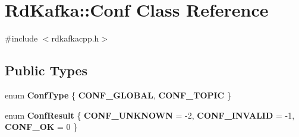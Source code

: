 \hypertarget{classRdKafka_1_1Conf}{\section{Rd\-Kafka\-:\-:Conf Class Reference}
\label{classRdKafka_1_1Conf}
}


{\ttfamily \#include $<$rdkafkacpp.\-h$>$}

\subsection*{Public Types}
\begin{DoxyCompactItemize}
\item 
enum {\bfseries Conf\-Type} \{ {\bfseries C\-O\-N\-F\-\_\-\-G\-L\-O\-B\-A\-L}, 
{\bfseries C\-O\-N\-F\-\_\-\-T\-O\-P\-I\-C}
 \}
\item 
enum {\bfseries Conf\-Result} \{ {\bfseries C\-O\-N\-F\-\_\-\-U\-N\-K\-N\-O\-W\-N} = -\/2, 
{\bfseries C\-O\-N\-F\-\_\-\-I\-N\-V\-A\-L\-I\-D} = -\/1, 
{\bfseries C\-O\-N\-F\-\_\-\-O\-K} = 0
 \}
\end{DoxyCompactItemize}
